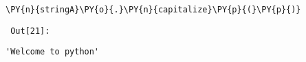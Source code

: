 
{\par%
\vspace{-1\baselineskip}%
}%
\begin{notebookcell}[21]%
\begin{addmargin}[\cellleftmargin]{0em}%
{\smaller%
\par%
%
\vspace{-1\smallerfontscale}%
\begin{Verbatim}[commandchars=\\\{\}]
\PY{n}{stringA}\PY{o}{.}\PY{n}{capitalize}\PY{p}{(}\PY{p}{)}
\end{Verbatim}
%
\par%
\vspace{-1\smallerfontscale}}%
\end{addmargin}
\end{notebookcell}

\par\vspace{1\smallerfontscale}%
    
        {\par%
        \vspace{-1\smallerfontscale}%
        \noindent%
        \begin{minipage}{\cellleftmargin}%
    \hfill%
    {\smaller%
    \tt%
    \color{nbframe-out-prompt}%
    Out[21]:}%
    \hspace{\inputpadding}%
    \hspace{0em}%
    \hspace{3pt}%
    \end{minipage}%
        }%
    \begin{addmargin}[\cellleftmargin]{0em}%
    {\smaller%
    \vspace{-1\smallerfontscale}%
    
    
    
    \begin{verbatim}
'Welcome to python'
    \end{verbatim}

    
}%
    \end{addmargin}%

